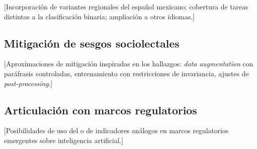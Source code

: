 [Incorporación de variantes regionales del español mexicano; cobertura de
tareas distintas a la clasificación binaria; ampliación a otros idiomas.]

\subsection{Mitigación de sesgos sociolectales}

[Aproximaciones de mitigación inspiradas en los hallazgos:
\textit{data augmentation} con paráfrasis controladas, entrenamiento con
restricciones de invariancia, ajustes de \textit{post-processing}.]

\subsection{Articulación con marcos regulatorios}

[Posibilidades de uso del \INS o de indicadores análogos en marcos
regulatorios emergentes sobre inteligencia artificial.]
